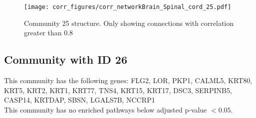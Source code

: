 \begin{figure}[h!]
\centering
\texttt{[image: corr\_figures/corr\_networkBrain\_Spinal\_cord\_25.pdf]}
\caption{Community 25 structure. Only showing connections with correlation greater than 0.8}
\end{figure}




\subsection*{Community with ID 26}
This community has the following genes: FLG2, LOR, PKP1, CALML5, KRT80, KRT5, KRT2, KRT1, KRT77, TNS4, KRT15, KRT17, DSC3, SERPINB5, CASP14, KRTDAP, SBSN, LGALS7B, NCCRP1
\\
This community has no enriched pathways below adjusted p-value $< 0.05$.

